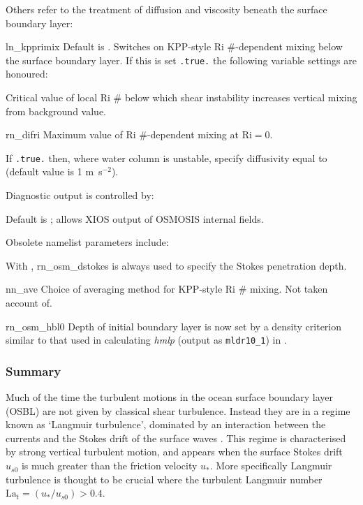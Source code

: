\documentclass[../main/NEMO_manual]{subfiles}
\begin{document}
    Others refer to the treatment of diffusion and viscosity beneath
    the surface boundary layer:
\begin{description}
   \item \protect{} {ln\_kpprimix}  Default is . Switches on KPP-style Ri \#-dependent
     mixing below the surface boundary layer. If this is set
     \texttt{.true.}  the following variable settings are honoured:
    \item \protect{} Critical value of local Ri \# below which
      shear instability increases vertical mixing from background value.
    \item \protect{} {rn\_difri} Maximum value of Ri \#-dependent mixing at $\mathrm{Ri}=0$.
    \item \protect{} If \texttt{.true.} then, where water column is unstable, specify
       diffusivity equal to \protect{} (default value is 1 m~s$^{-2}$).
 \end{description}
 Diagnostic output is controlled by:
  \begin{description}
    \item \protect{} Default is ; allows XIOS output of OSMOSIS internal fields.
  \end{description}
Obsolete namelist parameters include:
\begin{description}
\item \protect{} With \protect{},
  \protect{} {rn\_osm\_dstokes} is always used to specify the Stokes
  penetration depth.
\item \protect{} {nn\_ave} Choice of averaging method for KPP-style Ri \#
  mixing. Not taken account of.
\item \protect{} {rn\_osm\_hbl0} Depth of initial boundary layer is now set
  by a density criterion similar to that used in calculating \emph{hmlp} (output as \texttt{mldr10\_1}) in .
\end{description}

\subsubsection{Summary}
Much of the time the turbulent motions in the ocean surface boundary
layer (OSBL) are not given by
classical shear turbulence. Instead they are in a regime known as
`Langmuir turbulence',  dominated by an
interaction between the currents and the Stokes drift of the surface waves \citep[e.g.][]{mcwilliams.sullivan.ea_JFM97}.
This regime is characterised by strong vertical turbulent motion, and appears when the surface Stokes drift $u_{s0}$ is much greater than the friction velocity $u_{\ast}$. More specifically Langmuir turbulence is thought to be crucial where the turbulent Langmuir number $\mathrm{La}_{t}=(u_{\ast}/u_{s0}) > 0.4$.
\end{document}
